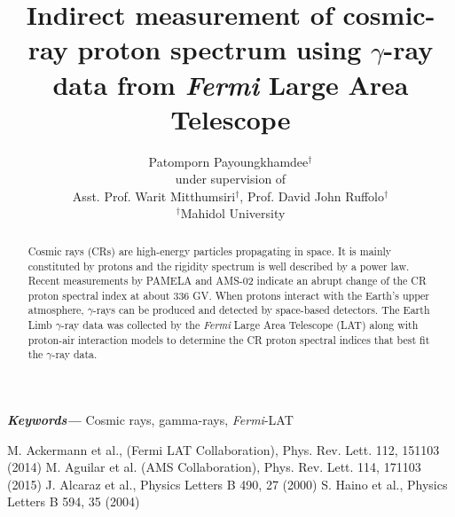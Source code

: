 \documentclass[a4paper, 12pt]{article}
\title{Indirect measurement of cosmic-ray proton spectrum using $\gamma$-ray data from {\it Fermi} Large Area Telescope}
\author{
  Patomporn Payoungkhamdee$^{\dagger}$\\
  under supervision of\\
  Asst. Prof. Warit Mitthumsiri$^{\dagger}$, Prof. David John Ruffolo$^{\dagger}$\\
  \small $^{\dagger}$Mahidol University
}
\date{} %
\providecommand{\keywords}[1]
{
  \small	
  \textbf{\textit{Keywords---}} #1
}
\begin{document}
\maketitle

\begin{abstract}
\normalsize
Cosmic rays (CRs) are high-energy particles propagating in space. It is mainly constituted by protons and the rigidity spectrum is well described by a power law. Recent
measurements by PAMELA and AMS-02 indicate an abrupt change of the CR proton
spectral index at about 336 GV. When protons interact with the Earth’s upper atmosphere, $\gamma$-rays can be produced and detected by space-based detectors. The
Earth Limb $\gamma$-ray data was collected by the {\it Fermi} Large Area Telescope (LAT) along with
proton-air interaction models to determine the CR proton spectral indices that best fit
the $\gamma$-ray data.\end{abstract} \hspace{10pt}

\keywords{ Cosmic rays, gamma-rays, {\it Fermi}-LAT}
\begin{thebibliography}{00}
\bibitem{} M. Ackermann et al., (Fermi LAT Collaboration), Phys. Rev. Lett. 112, 151103 (2014)
\bibitem{} M. Aguilar et al. (AMS Collaboration), Phys. Rev. Lett. 114, 171103 (2015)
\bibitem{} J. Alcaraz et al., Physics Letters B 490, 27 (2000)
\bibitem{} S. Haino et al., Physics Letters B 594, 35 (2004)
\end{thebibliography}



\end{document}
